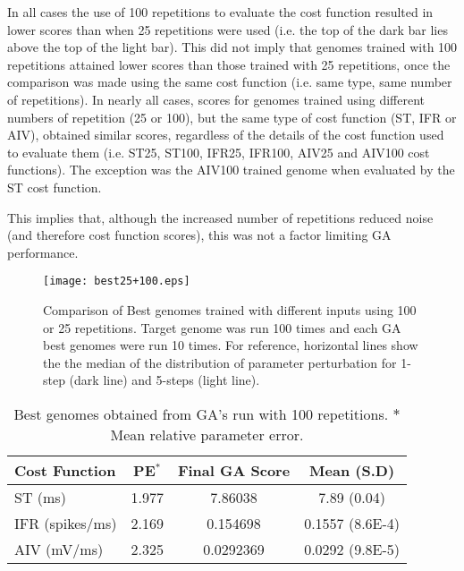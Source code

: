 \smallskip{}

In all cases the use of 100 repetitions to evaluate the cost function
resulted in lower scores than when 25 repetitions were used (i.e. the
top of the dark bar lies above the top of the light bar). This did not
imply that genomes trained with 100 repetitions attained lower scores
than those trained with 25 repetitions, once the comparison was made
using the same cost function (i.e. same type, same number of
repetitions). In nearly all cases, scores for genomes trained using
different numbers of repetition (25 or 100), but the same type of cost
function (ST, IFR or AIV), obtained similar scores, regardless of the
details of the cost function used to evaluate them (i.e. ST25, ST100,
IFR25, IFR100, AIV25 and AIV100 cost functions). The exception was the
AIV100 trained genome when evaluated by the ST cost
function. %

\smallskip{}

This implies that, although the increased number of repetitions
reduced noise (and therefore cost function scores), this was not a
factor limiting GA performance.

\begin{figure}[th!]
  \centering
  \texttt{[image: best25+100.eps]}
  \caption{Comparison of Best genomes trained with different inputs
    using 100 or 25 repetitions.  Target genome was run 100 times and
    each GA best genomes were run 10 times. For reference, horizontal
    lines show the the median of the distribution of parameter
    perturbation for 1-step (dark line) and 5-steps (light
    line).}\label{fig:GA:R7}
\end{figure}


\begin{table}[th]
  \centering
  \begin{tabularx}{0.95\textwidth}{Xccc}
Cost Function  & PE$^*$ & Final GA Score & Mean (S.D)\\[0.5ex]\hline
   ST (ms)     & 1.977  &    7.86038     & 7.89 (0.04) \\
IFR (spikes/ms)& 2.169  &    0.154698    & 0.1557 (8.6E-4) \\
 AIV (mV/ms)   & 2.325  &   0.0292369    & 0.0292 (9.8E-5)\\ \hline
\end{tabularx}
  \caption{Best genomes obtained from GA's run with 100 repetitions. $*$ Mean relative parameter error. }
  \label{tab:BestGenome100}
\end{table}

